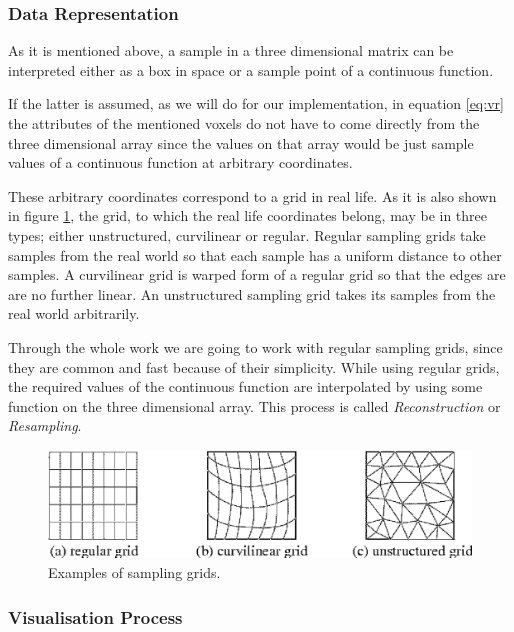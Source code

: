 \documentclass[a4paper,12pt]{article}
\begin{document}
\subsubsection{Data Representation}

As it is mentioned above, a sample in a three dimensional matrix can
be interpreted either as a box in space or a sample point of a
continuous function.

If the latter is assumed, as we will do for our implementation,
in equation \ref{eq:vr} the attributes of the
mentioned voxels do not have to come directly from the three
dimensional array since the values on that array would be just sample
values of a continuous function at arbitrary coordinates.

These arbitrary coordinates correspond to a grid in real life.  As it
is also shown in figure \ref{grid}, the grid, to which the real
life coordinates belong, may be in three types; either unstructured,
curvilinear or regular. Regular sampling grids take samples from the
real world so that each sample has a uniform distance to other
samples. A curvilinear grid is warped form of a regular grid so that
the edges are are no further linear. An unstructured sampling grid
takes its samples from the real world arbitrarily.

Through the whole work we are going to work with regular sampling
grids, since they are common and fast because of their simplicity.
While using regular grids,  the required values of the continuous function
are interpolated by using some function on the three
dimensional array. This process is called \emph{Reconstruction} or
\emph{Resampling}.


\begin{figure}  
\begin{center}  
  \includegraphics{grids.eps}
\caption{ Examples of sampling grids.}
\label{grid}
\end{center}
\end{figure} 
    
\subsubsection{Visualisation Process}
\end{document}
